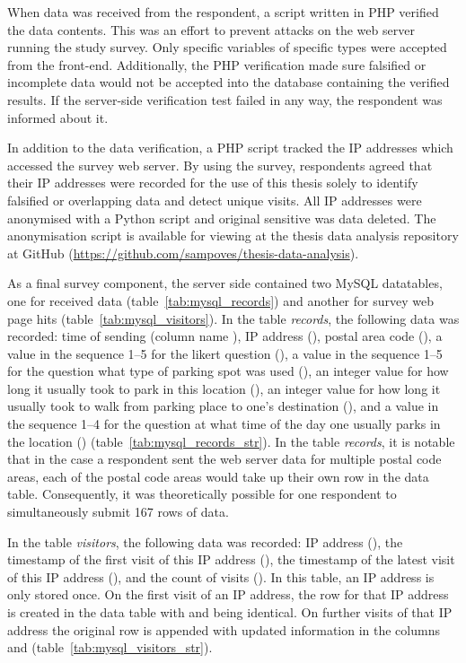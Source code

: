 When data was received from the respondent, a script written in PHP verified the data contents. This was an effort to prevent attacks on the web server running the study survey. Only specific variables of specific types were accepted from the front-end. Additionally, the PHP verification made sure falsified or incomplete data would not be accepted into the database containing the verified results. If the server-side verification test failed in any way, the respondent was informed about it. 

In addition to the data verification, a PHP script tracked the IP addresses which accessed the survey web server. By using the survey, respondents agreed that their IP addresses were recorded for the use of this thesis solely to identify falsified or overlapping data and detect unique visits. All IP addresses were anonymised with a Python script and original sensitive was data deleted. The anonymisation script is available for viewing at the thesis data analysis repository at GitHub (\textcolor{blue}{\url{https://github.com/sampoves/thesis-data-analysis}}).

As a final survey component, the server side contained two MySQL datatables, one for received data (table~\ref{tab:mysql_records}) and another for survey web page hits (table~\ref{tab:mysql_visitors}). In the table \textit{records}, the following data was recorded: time of sending (column name ), IP address (), postal area code (), a value in the sequence 1--5 for the likert question (), a value in the sequence 1--5 for the question what type of parking spot was used (), an integer value for how long it usually took to park in this location (), an integer value for how long it usually took to walk from parking place to one's destination (), and a value in the sequence 1--4 for the question at what time of the day one usually parks in the location () (table~\ref{tab:mysql_records_str}). In the table \textit{records}, it is notable that in the case a respondent sent the web server data for multiple postal code areas, each of the postal code areas would take up their own row in the data table. Consequently, it was theoretically possible for one respondent to simultaneously submit 167 rows of data.

In the table \textit{visitors}, the following data was recorded: IP address (), the timestamp of the first visit of this IP address (), the timestamp of the latest visit of this IP address (), and the count of visits (). In this table, an IP address is only stored once. On the first visit of an IP address, the row for that IP address is created in the data table with  and  being identical. On further visits of that IP address the original row is appended with updated information in the columns  and  (table~\ref{tab:mysql_visitors_str}).

